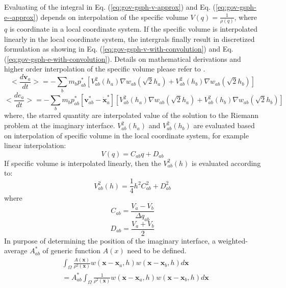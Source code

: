 Evaluating of the integral in Eq. (\ref{eq:gov-gsph-v-approx}) and Eq. (\ref{eq:gov-gsph-e--approx}) depends on interpolation of the specific volume $V(q) = \frac{1}{\rho(q)}$, where $q$ is coordinate in a local coordinate system. If the specific volume is interpolated linearly in the local coordinate system, the intergrals finally result in discretized formulation as showing in Eq. (\ref{eq:gov-gsph-v-with-convolution}) and Eq. (\ref{eq:gov-gsph-e-with-convolution}).
Details on mathematical derivations and higher order interpolation of the specific volume please refer to \citep{inutsuka2002reformulation}.
\begin{equation}
<\dfrac{d \textbf{v}_{a}}{dt}>= -\sum_{b} m_{b} p_{a b}^{\ast} \left[ V_{ab}^2(h_a) \nabla w_{a b}(\sqrt{2} h_{a}) + V_{ab}^2(h_b) \nabla w_{a b}(\sqrt{2} h_{b}) \right]
\label{eq:gov-gsph-v-with-convolution}
\end{equation}
\begin{equation}
<\dfrac{d e_{a}}{dt}>= - \sum_{b} m_{b} p_{a b}^{\ast} [\textbf{v}_{a b}^{\ast} - \dot{\textbf{x}}_{a}^{\ast}] \left[V_{ab}^2(h_a) \nabla w_{a b}(\sqrt{2} h_{a}) + V_{ab}^2(h_b) \nabla w_{a b}(\sqrt{2} h_{b}) \right]
\label{eq:gov-gsph-e-with-convolution}
\end{equation}
where, the starred quantity are interpolated value of the solution to the Riemann problem at the imaginary interface.
$V_{ab}^2(h_a)$ and $V_{ab}^2(h_b)$ are evaluated based on interpolation of specific volume in the local coordinate system, for example linear interpolation: 
\begin{equation}
V(q) = C_{ab}q+D_{ab}
\label{eq:gsph-V-linear-interplation}
\end{equation}
If specific volume is interpolated linearly, then the $V^2_{ab}(h)$ is evaluated according to:
\begin{equation}
V^2_{ab}(h) = \frac{1}{4}h^2C_{ab}^2+D_{ab}^2
\label{eq:gsph-V-linear-interplation-sq}
\end{equation}
where
\begin{equation}
C_{ab} = \frac{V_a-V_b}{\Delta q_{ab}}
\label{eq:gsph-V-linear-interplation-C}
\end{equation}
\begin{equation}
D_{ab} = \frac{V_a+V_b}{2}
\label{eq:gsph-V-linear-interplation-D}
\end{equation}
In purpose of determining the position of the imaginary interface, a weighted-average $A_{ab}^{\ast}$ of generic function $A(x)$ need to be defined.
\begin{equation}
\begin{split}
& \int_{\Omega} \frac{A\left(\textbf{x} \right)}{\rho^2(\textbf{x})} w\left(\textbf{x} -\textbf{x}_a, h\right) w(\textbf{x} - \textbf{x}_{b}, h) d\textbf{x} \\
& =A_{ab}^{\ast} \int_{\Omega} \frac{1}{\rho^2(\textbf{x})} w\left(\textbf{x} -\textbf{x}_a, h\right) w(\textbf{x} - \textbf{x}_{b}, h) d\textbf{x}
\end{split}
\label{eq:GSPH-f-interpolation-def}
\end{equation}
